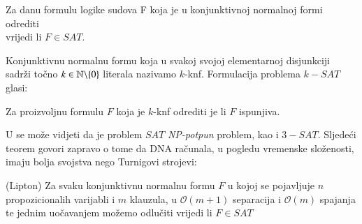 \documentclass[a4paper,oneside,12pt]{memoir} %
\begin{document}
\begin{spacing}{1.5}
\begin{center}
Za danu formulu logike sudova F koja je u konjunktivnoj normalnoj formi odrediti\\ vrijedi li $F \in  SAT$.
\end{center}
Konjunktivnu normalnu formu koja u svakoj svojoj elementarnoj disjunkciji sadrži točno $k \in \mathbb{N} \backslash \{0\}$ literala nazivamo $k$-knf. Formulacija problema $k-SAT$ glasi:
\begin{center}
	Za proizvoljnu formulu $F$ koja je $k$-knf odrediti je li $F$ ispunjiva. 
\end{center} 
U \cite{Sipser} se može vidjeti da je problem $SAT$ \textit{NP-potpun} problem, kao i $3-SAT$.
Sljedeći teorem govori zapravo o tome da DNA računala, u pogledu vremenske složenosti, imaju bolja svojstva nego Turnigovi strojevi:
\begin{thm} (Lipton)
Za svaku konjunktivnu normalnu formu $F$ u kojoj se pojavljuje $n$ propozicionalih varijabli i $m$ klauzula, u $\mathcal{O}(m+1)$ separacija i $\mathcal{O}(m)$ spajanja te jednim uočavanjem možemo odlučiti vrijedi li $F \in SAT$
\end{thm}
\newpage
\nocite{*}


\end{spacing}
\end{document}
